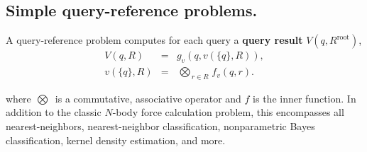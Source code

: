 \documentclass[twoside,leqno,twocolumn]{article}
\newcommand{\bigvec}[1]{\mathop{\overrightarrow{#1}}}
\newcommand{\summary}{\delta}
\newcommand{\mysub}[1]{\subsection{#1.}}
\newcommand{\defterm}[1]{{\bf #1}}
\newcommand{\kdroot}[1]{#1^{\text{root}}}
\newcommand{\lo}[1]{#1^{l}}
\newcommand{\up}[1]{#1^{u}}
\newcommand{\distlo}{\lo{d}}
\newcommand{\distup}{\up{d}}
\newcommand{\nameOp}[2]{\mathop{#1\nolimits\!\!_{#2}}}
\newcommand{\nameop}[2]{#1_{\!#2}}
\newcommand{\myOp}[1]{\nameOp{\bigotimes}{#1}}
\newcommand{\myop}[1]{\nameop{\otimes}{#1}}
\newcommand{\letterglob}{\psi}
\newcommand{\canpruneglob}{C_{\letterglob}}
\newcommand{\deltaglob}{\summary_{\letterglob}}
\newcommand{\letterqr}{v}
\newcommand{\outqr}{V}
\newcommand{\Opqr}{\myOp{\letterqr}}
\newcommand{\fqr}{f_{\letterqr}}
\newcommand{\gqr}{g_{\letterqr}}
\newcommand{\inqrv}{v}
\newcommand{\letterstat}{s}
\newcommand{\outstat}{\sigma}
\newcommand{\opstat}{\myop{\letterstat}}
\newcommand{\fstat}{f_{\letterstat}}
\begin{document}
%


\mysub{Simple query-reference problems}
A query-reference problem computes for each query a \defterm{query result} $\outqr(q, \kdroot{R})$,
\begin{eqnarray}
\outqr(q, R) &=& \gqr(q, \inqrv(\{q\}, R)),
\\
\inqrv(\{q\}, R) &=& \Opqr_{r \in R} \fqr(q, r).
\label{eqn:qrdef}
\end{eqnarray}

\noindent
where $\Opqr$ is a commutative, associative operator and $f$ is the inner function.
In addition to the classic $N$-body force calculation problem, this encompasses all nearest-neighbors, nearest-neighbor classification, nonparametric Bayes classification, kernel density estimation, and more.
\end{document}
